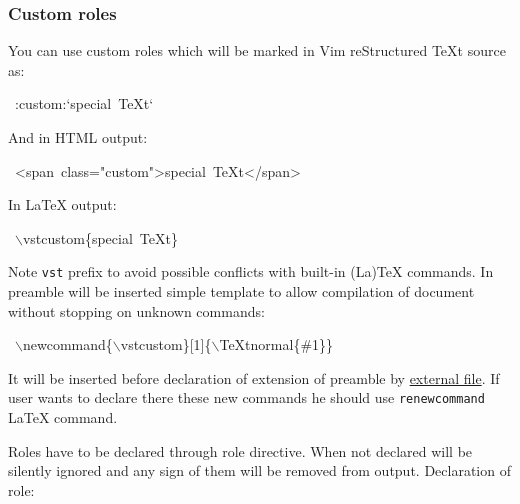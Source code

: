 \documentclass[12pt]{article}
\begin{document}
\hypertarget{lcustom-roles}{}
\subsubsection{Custom roles}

You can use custom roles which will be marked in Vim reStructured \TeX{}t source as:

\begin{ttfamily}\begin{flushleft}
\mbox{~:custom:`special~\TeX{}t`}\\
\end{flushleft}\end{ttfamily}

And in HTML output:

\begin{ttfamily}\begin{flushleft}
\mbox{~<span~class="custom">special~\TeX{}t</span>}\\
\end{flushleft}\end{ttfamily}

In \LaTeX{} output:

\begin{ttfamily}\begin{flushleft}
\mbox{~$\backslash$vstcustom\{special~\TeX{}t\}}\\
\end{flushleft}\end{ttfamily}

Note \texttt{vst} prefix to avoid possible conflicts with built-in (La)\TeX{}
commands. In preamble will be inserted simple template to allow compilation of
document without stopping on unknown commands:

\begin{ttfamily}\begin{flushleft}
\mbox{~$\backslash$newcommand\{$\backslash$vstcustom\}[1]\{$\backslash$\TeX{}tnormal\{\#1\}\}}\\
\end{flushleft}\end{ttfamily}

It will be inserted before declaration of extension of preamble by \href{\#lvtp}{external
file}. If user wants to declare there these new commands he should
use \texttt{renewcommand} \LaTeX{} command.

Roles have to be declared through \hypertarget{lrole-directive}{role directive}. When not declared will be
silently ignored and any sign of them will be removed from output. Declaration
of role:
\end{document}
